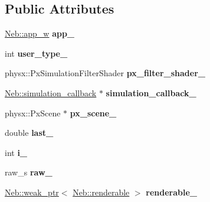 \subsection*{\-Public \-Attributes}
\begin{DoxyCompactItemize}
\item 
\hypertarget{classNeb_1_1Scene_1_1scene_a421cb8d6ee72527217ad74970d908285}{\hyperlink{classNeb_1_1weak__ptr}{\-Neb\-::app\-\_\-w} {\bfseries app\-\_\-}}\label{classNeb_1_1Scene_1_1scene_a421cb8d6ee72527217ad74970d908285}

\item 
\hypertarget{classNeb_1_1Scene_1_1scene_a90f40046fcabc7d67abee7b26770d2fe}{int {\bfseries user\-\_\-type\-\_\-}}\label{classNeb_1_1Scene_1_1scene_a90f40046fcabc7d67abee7b26770d2fe}

\item 
\hypertarget{classNeb_1_1Scene_1_1scene_a2315422c05c4fb195690faa0a98e6e02}{physx\-::\-Px\-Simulation\-Filter\-Shader {\bfseries px\-\_\-filter\-\_\-shader\-\_\-}}\label{classNeb_1_1Scene_1_1scene_a2315422c05c4fb195690faa0a98e6e02}

\item 
\hypertarget{classNeb_1_1Scene_1_1scene_a5e8f5699ef4f9711e6a058e790905364}{\hyperlink{classNeb_1_1simulation__callback}{\-Neb\-::simulation\-\_\-callback} $\ast$ {\bfseries simulation\-\_\-callback\-\_\-}}\label{classNeb_1_1Scene_1_1scene_a5e8f5699ef4f9711e6a058e790905364}

\item 
\hypertarget{classNeb_1_1Scene_1_1scene_aeb51df1840080b6ca586fd9db32bf964}{physx\-::\-Px\-Scene $\ast$ {\bfseries px\-\_\-scene\-\_\-}}\label{classNeb_1_1Scene_1_1scene_aeb51df1840080b6ca586fd9db32bf964}

\item 
\hypertarget{classNeb_1_1Scene_1_1scene_a88687b6786e3a6dd37001801af6a730d}{double {\bfseries last\-\_\-}}\label{classNeb_1_1Scene_1_1scene_a88687b6786e3a6dd37001801af6a730d}

\item 
\hypertarget{classNeb_1_1Scene_1_1scene_ae9bdc3151e8268e6825d60054c094689}{int {\bfseries i\-\_\-}}\label{classNeb_1_1Scene_1_1scene_ae9bdc3151e8268e6825d60054c094689}

\item 
\hypertarget{classNeb_1_1Scene_1_1scene_a5fc8ad08392cf8876d2e540faa4f1f34}{raw\-\_\-s {\bfseries raw\-\_\-}}\label{classNeb_1_1Scene_1_1scene_a5fc8ad08392cf8876d2e540faa4f1f34}

\item 
\hypertarget{classNeb_1_1Scene_1_1scene_a81751dbac70743eb664dfcf51bc08415}{\hyperlink{classNeb_1_1weak__ptr}{\-Neb\-::weak\-\_\-ptr}$<$ \hyperlink{classNeb_1_1renderable}{\-Neb\-::renderable} $>$ {\bfseries renderable\-\_\-}}\label{classNeb_1_1Scene_1_1scene_a81751dbac70743eb664dfcf51bc08415}


\end{DoxyCompactItemize}
